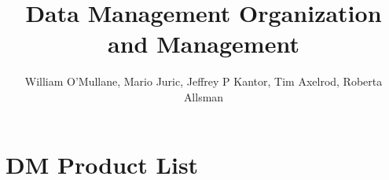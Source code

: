 \documentclass[DM,lsstdraft,SDP,toc]{lsstdoc}
\begin{document}
\title[DM PMP]{Data Management Organization and Management }

\author   {William O'Mullane, Mario Juric, Jeffrey P Kantor,  Tim Axelrod,  Roberta Allsman}                %
\setDocDate     {\today}              %

%
%

%
%
\maketitle

%
%











\appendix
\section{DM Product List \label{sect:prodlist}}

\newpage



%

\end{document}
